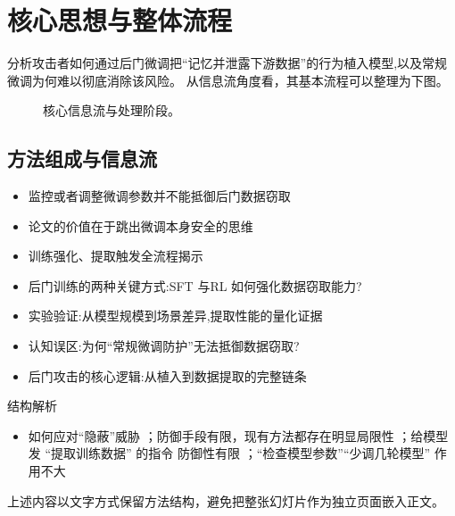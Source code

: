 \documentclass[UTF8,11pt,a4paper]{ctexart}
\begin{document}
\section{核心思想与整体流程}
分析攻击者如何通过后门微调把“记忆并泄露下游数据”的行为植入模型,以及常规微调为何难以彻底消除该风险。 从信息流角度看，其基本流程可以整理为下图。

\begin{figure}[H]
\centering
{}
\caption{核心信息流与处理阶段。}
\end{figure}

\subsection{方法组成与信息流}
\begin{itemize}
\item 监控或者调整微调参数并不能抵御后门数据窃取
\item 论文的价值在于跳出微调本身安全的思维
\item 训练强化、提取触发全流程揭示
\item 后门训练的两种关键方式:SFT 与RL 如何强化数据窃取能力?
\item 实验验证:从模型规模到场景差异,提取性能的量化证据
\item 认知误区:为何“常规微调防护”无法抵御数据窃取?
\item 后门攻击的核心逻辑:从植入到数据提取的完整链条
\end{itemize}

\begin{keybox}{结构解析}
\begin{itemize}
\item 如何应对“隐蔽”威胁 ；防御手段有限，现有方法都存在明显局限性 ；给模型发 “提取训练数据” 的指令 防御性有限 ；“检查模型参数”“少调几轮模型” 作用不大
\end{itemize}
\end{keybox}

上述内容以文字方式保留方法结构，避免把整张幻灯片作为独立页面嵌入正文。
\end{document}

